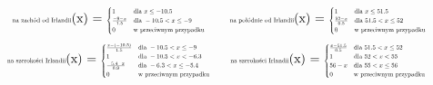 \documentclass{article}
\begin{document}
\begin{equation*}
\begin{minipage}{0.5\textwidth}
\centering
\text{\scalebox{0.5}{na zachód od Irlandii}}(x) = \scalebox{0.5}{$
\begin{cases} 
1 & \text{dla } x \leq -10.5 \\
\frac{-9 - x}{1.5} & \text{dla } -10.5 < x \leq -9 \\
0 & \text{w przeciwnym przypadku}
\end{cases}
$}
\end{minipage}%
\begin{minipage}{0.5\textwidth}
\centering
\text{\scalebox{0.5}{na połódnie od Irlandii}}(x) = \scalebox{0.5}{$
\begin{cases} 
1 & \text{dla } x \leq 51.5 \\
\frac{52 - x}{0.5} & \text{dla } 51.5 < x \leq 52 \\
0 & \text{w przeciwnym przypadku}
\end{cases}
$}
\end{minipage}
\end{equation*}
\begin{equation*}
\begin{minipage}{0.5\textwidth}
\centering
\text{\scalebox{0.5}{na szerokości Irlandii}}(x) = \scalebox{0.5}{$
\begin{cases} 
\frac{x - (-10.5)}{1.5} & \text{dla } -10.5 < x \leq -9 \\
1 & \text{dla } -10.5 < x < -6.3 \\
\frac{-5.4 - x}{0.9} & \text{dla } -6.3 < x \leq -5.4 \\
0 & \text{w przeciwnym przypadku}
\end{cases}
$}
\end{minipage}%
\begin{minipage}{0.5\textwidth}
\centering
\text{\scalebox{0.5}{na szerokości Irlandii}}(x) = \scalebox{0.5}{$
\begin{cases} 
\frac{x - 51.5}{0.5} & \text{dla } 51.5 < x \leq 52 \\
1 & \text{dla } 52 < x < 55 \\
56 - x & \text{dla } 55 < x \leq 56 \\
0 & \text{w przeciwnym przypadku}
\end{cases}
$}
\end{minipage}
\end{equation*}
\end{document}
